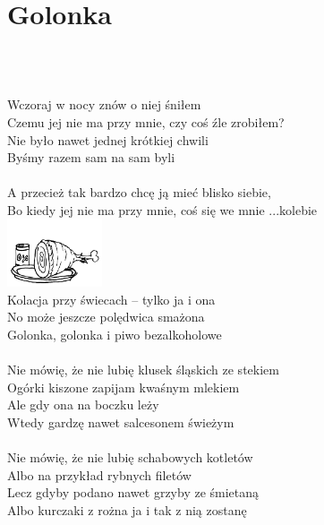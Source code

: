 \documentclass[a5paper, 10pt]{book}
\begin{document}
\section{Golonka}\textcolor{lightgray}{\textit{}}\\~\\
\begin{minipage}[t]{0.8\textwidth}
Wczoraj w nocy znów o niej śniłem\\
Czemu jej nie ma przy mnie, czy coś źle zrobiłem?\\
Nie było nawet jednej krótkiej chwili\\
Byśmy razem sam na sam byli\\
\\
A przecież tak bardzo chcę ją mieć blisko siebie,\\
Bo kiedy jej nie ma przy mnie, coś się we mnie ...kolebie\\
\includegraphics[height=20mm,right]{images/golonka.png}\vspace*{-21mm}\\
Kolacja przy świecach – tylko ja i ona\\
No może jeszcze polędwica smażona\\

\hspace*{5mm}Golonka, golonka i piwo bezalkoholowe\\
\\
Nie mówię, że nie lubię klusek śląskich ze stekiem\\
Ogórki kiszone zapijam kwaśnym mlekiem\\
Ale gdy ona na boczku leży\\
Wtedy gardzę nawet salcesonem świeżym\\
\\
Nie mówię, że nie lubię schabowych kotletów\\
Albo na przykład rybnych filetów\\
Lecz gdyby podano nawet grzyby ze śmietaną\\
Albo kurczaki z rożna ja i tak z nią zostanę\\
\end{minipage}
\end{document}

